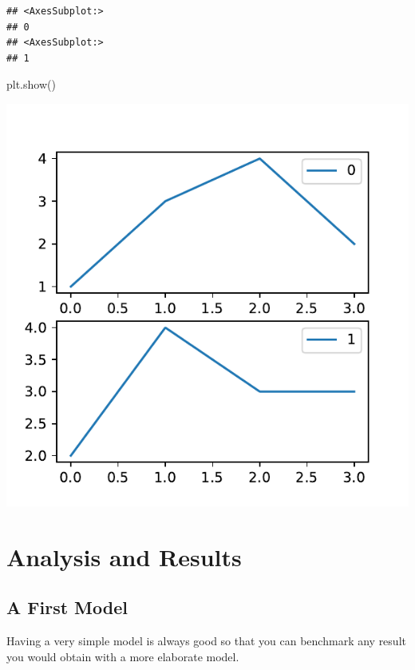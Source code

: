 \documentclass[mstat,12pt]{unswthesis}
\newenvironment{Shaded}{\begin{snugshade}}{\end{snugshade}}
\newcommand{\NormalTok}[1]{#1}
\begin{document}
\begin{verbatim}
## <AxesSubplot:>
## 0
## <AxesSubplot:>
## 1
\end{verbatim}

\begin{Shaded}
\begin{Highlighting}[]
\NormalTok{plt.show()}
\end{Highlighting}
\end{Shaded}

\includegraphics{unsw-ZZSC9020-report_files/figure-latex/unnamed-chunk-2-1.pdf}

\hypertarget{analysis-and-results}{%
\chapter{Analysis and Results}\label{analysis-and-results}}

\hypertarget{a-first-model}{%
\section{A First Model}\label{a-first-model}}

Having a very simple model is always good so that you can benchmark any
result you would obtain with a more elaborate model.

\bigskip
\end{document}
